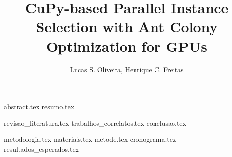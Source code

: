 \documentclass{article}
\title{CuPy-based Parallel Instance Selection with Ant Colony Optimization for GPUs}
\author{{Lucas S. Oliveira\inst{1}, Henrique C. Freitas\inst{1}}}
\begin{document}
 

\maketitle

{abstract.tex}
{resumo.tex}

{revisao_literatura.tex}
{trabalhos_correlatos.tex}
{conclusao.tex}

{metodologia.tex}
{materiais.tex}
{metodo.tex}
{cronograma.tex}
{resultados_esperados.tex}

\printbibliography
\end{document}
